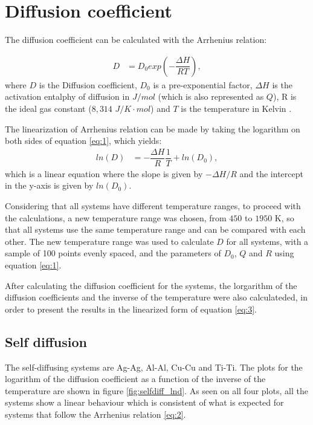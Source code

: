 \clearpage
\section{Diffusion coefficient}

The diffusion coefficient can be calculated with the Arrhenius relation:

\begin{align}
    \label{eq:1}
    D&=D_0 exp\left(-\dfrac{\Delta H}{RT}\right),
\end{align}
where $D$ is the Diffusion coefficient, $D_0$ is a pre-exponential factor, $\Delta H$ is the activation entalphy of diffusion in $J/mol$ (which is also represented as $Q$), R is the ideal gas constant ($8,314$ $J/K\cdot mol$) and $T$ is the temperature in Kelvin \citep{diff}. 

The linearization of Arrhenius relation can be made by taking the logarithm on both sides of equation \eqref{eq:1}, which yields:
\begin{align}
  \label{eq:2}
  ln(D)&=-\dfrac{\Delta H}{R}\dfrac{1}{T} + ln(D_0),
\end{align}
which is a linear equation where the slope is given by $-\Delta H/R$ and the intercept in the y-axis is given by $ln(D_0)$.

Considering that all systems have different temperature ranges, to proceed with the calculations, a new temperature range was chosen, from $450$ to $1950$ K, so that all systems use the same temperature range and can be compared with each other. The new temperature range was used to calculate $D$ for all systems, with a sample of 100 points evenly spaced, and the parameters of $D_0$, $Q$ and $R$ using equation \eqref{eq:1}.

After calculating the diffusion coefficient for the systems, the lorgarithm of the diffusion coefficients and the inverse of the temperature were also calculateded, in order to present the results in the linearized form of equation \eqref{eq:3}.

\subsection{Self diffusion}

The self-diffusing systems are Ag-Ag, Al-Al, Cu-Cu and Ti-Ti. The plots for the logarithm of the diffusion coefficient as a function of the inverse of the temperature are shown in figure \ref{fig:selfdiff_lnd}. As seen on all four plots, all the systems show a linear behaviour which is consistent of what is expected for systems that follow the Arrhenius relation \eqref{eq:2}. 

